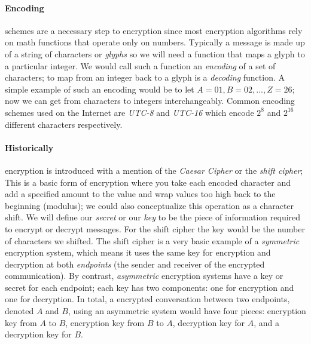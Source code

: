 \documentclass[12pt]{article}
\begin{document}
\paragraph{Encoding} schemes are a necessary step to encryption since most encryption algorithms rely on math functions that operate only on numbers.  Typically a message is made up of a string of characters or \textit{glyphs} so we will need a function that maps a glyph to a particular integer.  We would call such a function an \textit{encoding} of a set of characters; to map from an integer back to a glyph is a \textit{decoding} function.  A simple example of such an encoding would be to let $A=01,B=02,...,Z=26$; now we can get from characters to integers interchangeably.  Common encoding schemes used on the Internet are \textit{UTC-8} and \textit{UTC-16} which encode $2^8$ and $2^{16}$ different characters respectively.

\paragraph{Historically} encryption is introduced with a mention of the \textit{Caesar Cipher} or the \textit{shift cipher}; This is a basic form of encryption where you take each encoded character and add a specified amount to the value and wrap values too high back to the beginning (modulus); we could also conceptualize this operation as a character shift.  We will define our \textit{secret} or our \textit{key} to be the piece of information required to encrypt or decrypt messages.  For the shift cipher the key would be the number of characters we shifted.  The shift cipher is a very basic example of a \textit{symmetric} encryption system, which means it uses the same key for encryption and decryption at both \textit{endpoints} (the sender and receiver of the encrypted communication).  By contrast, \textit{asymmetric} encryption systems have a key or secret for each endpoint; each key has two components: one for encryption and one for decryption.  In total, a encrypted conversation between two endpoints, denoted $A$ and $B$, using an asymmetric system would have four pieces: encryption key from $A$ to $B$, encryption key from $B$ to $A$, decryption key for $A$, and a decryption key for $B$.
\end{document}
